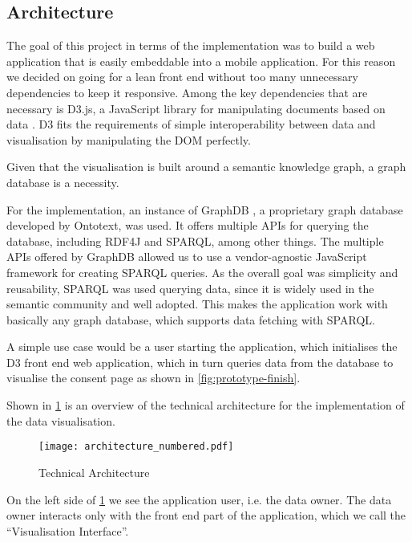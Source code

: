 \documentclass[../paper.tex]{subfiles}
\begin{document}
  \subsection{Architecture}

  The goal of this project in terms of the implementation was to
  build a web application that is easily embeddable into a mobile application.
  For this reason we decided on going for a lean front end without too many
  unnecessary dependencies to keep it responsive. Among the key dependencies that
  are necessary is D3.js, a JavaScript library for manipulating documents based
  on data \cite{d3}. D3 fits the requirements of simple interoperability between
  data and visualisation by manipulating the DOM perfectly.

  Given that the
  visualisation is built around a semantic knowledge graph, a graph database is
  a necessity.

  For the implementation, an instance of  GraphDB \cite{graphdb}, a proprietary graph
  database developed by Ontotext, was used. It offers multiple APIs for querying the database,
  including RDF4J and SPARQL, among other things. The multiple APIs offered by
  GraphDB allowed us to use a vendor-agnostic JavaScript framework for
  creating SPARQL queries. As the overall goal was simplicity and reusability,
  SPARQL was used querying data, since it is widely used
  in the semantic community and well adopted. This makes the application work with
  basically any graph database, which supports data fetching with SPARQL.

  A simple use case would be a user starting the application, which initialises
  the D3 front end web application, which in turn queries data from the database
  to visualise the consent page as shown in \cref{fig:prototype-finish}.
  

  Shown in \cref{fig:architecture} is an overview of the technical architecture
  for the implementation of the data visualisation.

  \begin{figure}
    \centering
    \texttt{[image: architecture\_numbered.pdf]}
    \caption{Technical Architecture}
    \label{fig:architecture}
  \end{figure}

  On the left side of \cref{fig:architecture} we see the application user, i.e.
  the data owner. The data owner interacts only with the front end part of the
  application, which we call the “Visualisation Interface”.
\end{document}
